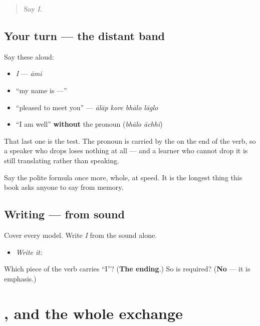 \label{lesson:BN-R01-ami-again}



\begin{quote}
Say \emph{I}.
\end{quote}

\subsection*{Your turn — the distant band}
Say these aloud:

\begin{itemize}
\raggedright
  \item \emph{I} — \emph{āmi}
  \item \textquotedblleft{}my name is —\textquotedblright{}
  \item \textquotedblleft{}pleased to meet you\textquotedblright{} — \emph{ālāp kore bhālo lāglo}
  \item \textquotedblleft{}I am well\textquotedblright{} \textbf{without} the pronoun (\emph{bhālo āchhi})
\end{itemize}

That last one is the test. The pronoun is carried by the \textbf{} on the end of the verb, so a speaker who drops \textbf{} loses nothing at all — and a learner who cannot drop it is still translating rather than speaking.

Say the polite formula once more, whole, at speed. It is the longest thing this book asks anyone to say from memory.

\subsection*{Writing — from sound}
Cover every model. Write \emph{I} from the sound alone.

\begin{itemize}
\raggedright
  \item \emph{Write it:} 
\end{itemize}

\begin{tcolorbox}[breakable,colback=teal!4,colframe=teal!35!black,title={Before you move on}]
Which piece of the verb carries \textquotedblleft{}I\textquotedblright{}? (\textbf{The  ending}.) So is \textbf{} required? (\textbf{No} — it is emphasis.)
\end{tcolorbox}
\section[Practice]{, and the whole exchange}

